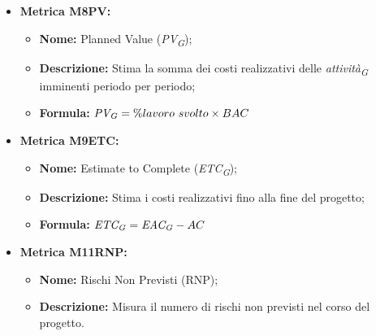 \begin{itemize}
    \item \hypertarget{item:M8PV}{\textbf{Metrica M8PV:}}
    \begin{minipage}[t]{0.9\textwidth}
          \begin{itemize}
              \item \textbf{Nome:} Planned Value (\textit{PV}\textsubscript{\textit{G}});
              \item \textbf{Descrizione:} Stima la somma dei costi realizzativi delle \textit{attività}\textsubscript{\textit{G}} imminenti periodo per periodo;
              \item \textbf{Formula:} $\textit{PV}\textsubscript{\textit{G}} = \% lavoro \ svolto \times BAC$
          \end{itemize}
        \end{minipage}

    \item \hypertarget{item:M9ETC}{\textbf{Metrica M9ETC:}}
    \begin{minipage}[t]{0.9\textwidth}
          \begin{itemize}
              \item \textbf{Nome:} Estimate to Complete (\textit{ETC}\textsubscript{\textit{G}});
              \item \textbf{Descrizione:} Stima i costi realizzativi fino alla fine del progetto;
              \item \textbf{Formula:} $\textit{ETC}\textsubscript{\textit{G}} =\textit{EAC}\textsubscript{\textit{G}} - AC$
          \end{itemize}
        \end{minipage}

    \item \hypertarget{item:M11RNP}{\textbf{Metrica M11RNP:}}
    \begin{minipage}[t]{0.9\textwidth}
          \begin{itemize}
              \item \textbf{Nome:} Rischi Non Previsti (RNP);
              \item \textbf{Descrizione:} Misura il numero di rischi non previsti nel corso del progetto.
          \end{itemize}
        \end{minipage}


\end{itemize}
